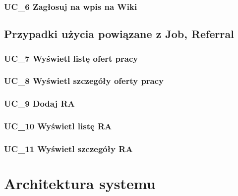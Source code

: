 \documentclass{scrreprt}
\begin{document}
\subsection{UC\_6 Zagłosuj na wpis na Wiki}

\section{Przypadki użycia powiązane z Job, Referral}
\subsection{UC\_7 Wyświetl listę ofert pracy}
\subsection{UC\_8 Wyświetl szczegóły oferty pracy}
\subsection{UC\_9 Dodaj RA}
\subsection{UC\_10 Wyświetl listę RA}
\subsection{UC\_11 Wyświetl szczegóły RA}


\chapter{Architektura systemu}
\end{document}
